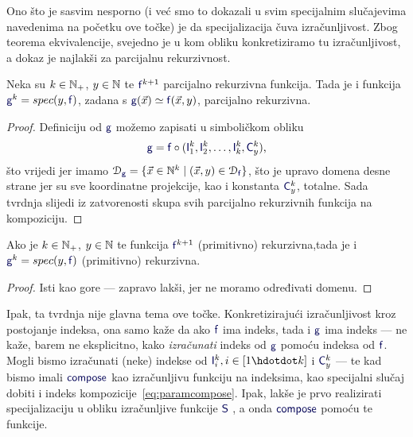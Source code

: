 Ono što je sasvim nesporno (i već smo to dokazali u svim specijalnim slučajevima navedenima na početku ove točke) je da specijalizacija čuva izračunljivost. Zbog teorema ekvivalencije, svejedno je u kom obliku konkretiziramo tu izračunljivost, a dokaz je najlakši za parcijalnu rekurzivnost.

\begin{propozicija}[{name=[specijalizacija čuva parcijalnu rekurzivnost]}]
    Neka su $k\in{\mathbb N}_+$, $y\in{\mathbb N}$ te $\f f^{k+1}$ parcijalno rekurzivna funkcija.\newline
    Tada je i funkcija $\f g^k=spec(y,\f f)$, zadana s
    $\f g(\vec x)\simeq\f f(\vec x,y)$,
parcijalno rekurzivna.
\end{propozicija}
\begin{proof}
Definiciju od $\f g$ možemo zapisati u simboličkom obliku
\begin{equation}\label{eq:paramcompose}
    \f g=\f f\circ(\f I_1^k,\f I_2^k,\dotsc,\f I_k^k,\f C_y^k)\text,
\end{equation}
što vrijedi jer imamo $\dom{\f g}=\{\vec x\in\N^k\mid(\vec x,y)\in\dom{\f f}\}$, što je upravo domena desne strane jer su sve koordinatne projekcije, kao i konstanta $\f C_y^k$, totalne. Sada tvrdnja slijedi iz zatvorenosti skupa svih parcijalno rekurzivnih funkcija na kompoziciju.
\end{proof}

\begin{korolar}[{name=[specijalizacija čuva (primitivnu) rekurzivnost]}]\label{kor:paramprn}
    Ako je $k\in{\mathbb N}_+$, $y\in{\mathbb N}$ te funkcija $\f f^{k+1}$ (primitivno) rekurzivna,\newline tada je i $\f g^k=spec(y,\f f)$ (primitivno) rekurzivna.
\end{korolar}
\begin{proof}
Isti kao gore --- zapravo lakši, jer ne moramo određivati domenu.
\end{proof}

Ipak, ta tvrdnja nije glavna tema ove točke. Konkretizirajući izračunljivost kroz postojanje indeksa, ona samo kaže da ako $\f f$ ima indeks, tada i $\f g$ ima indeks --- ne kaže, barem ne eksplicitno, kako \emph{izračunati} indeks od $\f g$ pomoću indeksa od $\f f$. Mogli bismo izračunati (neke) indekse od $\f I_i^k,i\in[1\dd k]$ i $\f C_y^k$ --- te kad bismo imali $\f{compose}$ kao izračunljivu funkciju na indeksima, kao specijalni slučaj dobiti i indeks kompozicije~\eqref{eq:paramcompose}. Ipak, lakše je prvo realizirati specijalizaciju u obliku izračunljive funkcije $\f S$%
, a onda $\f{compose}$ pomoću te funkcije.

